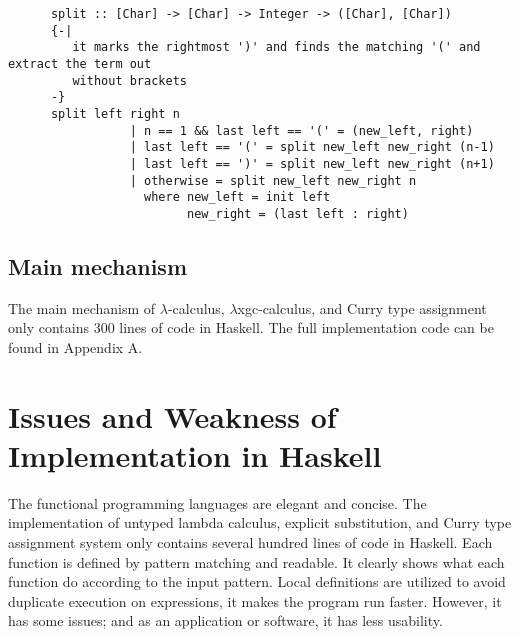 \begin{verbatim}
      split :: [Char] -> [Char] -> Integer -> ([Char], [Char])
      {-|
         it marks the rightmost ')' and finds the matching '(' and extract the term out
         without brackets
      -}
      split left right n
                 | n == 1 && last left == '(' = (new_left, right)
                 | last left == '(' = split new_left new_right (n-1)
                 | last left == ')' = split new_left new_right (n+1)
                 | otherwise = split new_left new_right n
                   where new_left = init left 
                         new_right = (last left : right)
\end{verbatim}

\subsection{Main mechanism}
The main mechanism of $\lambda$-calculus, $\lambda$xgc-calculus, and Curry type assignment only contains 300 lines of code in Haskell. The full implementation code can be found in Appendix A.   





\section{Issues and Weakness of Implementation in Haskell }

The functional programming languages are elegant and concise. The implementation of untyped lambda calculus, explicit substitution, and Curry type assignment system only contains several hundred lines of code in Haskell. Each function is defined by pattern matching and readable. It clearly shows what each function do according to the input pattern. Local definitions are utilized to avoid duplicate execution on expressions, it makes the program run faster. However, it has some issues; and as an application or software, it has less usability.






   


